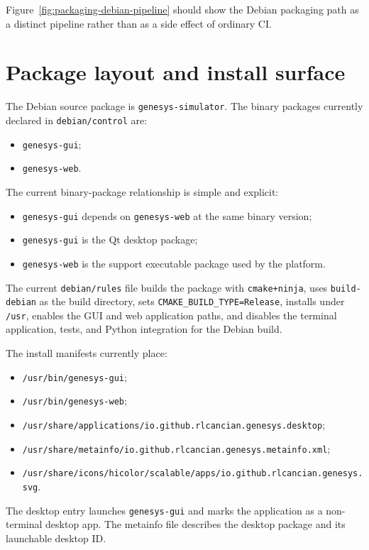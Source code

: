 Figure~\ref{fig:packaging-debian-pipeline} should show the Debian packaging path
as a distinct pipeline rather than as a side effect of ordinary CI.

\section{Package layout and install surface}
\label{sec:packaging-package-layout}

The Debian source package is \texttt{genesys-simulator}. The binary packages
currently declared in \texttt{debian/control} are:
\begin{itemize}
\item \texttt{genesys-gui};
\item \texttt{genesys-web}.
\end{itemize}

The current binary-package relationship is simple and explicit:
\begin{itemize}
\item \texttt{genesys-gui} depends on \texttt{genesys-web} at the same binary
  version;
\item \texttt{genesys-gui} is the Qt desktop package;
\item \texttt{genesys-web} is the support executable package used by the
  platform.
\end{itemize}

The current \texttt{debian/rules} file builds the package with
\texttt{cmake+ninja}, uses \texttt{build-debian} as the build directory, sets
\texttt{CMAKE\_BUILD\_TYPE=Release}, installs under \texttt{/usr}, enables the
GUI and web application paths, and disables the terminal application, tests, and
Python integration for the Debian build.

The install manifests currently place:
\begin{itemize}
\item \texttt{/usr/bin/genesys-gui};
\item \texttt{/usr/bin/genesys-web};
\item \texttt{/usr/share/applications/io.github.rlcancian.genesys.desktop};
\item \texttt{/usr/share/metainfo/io.github.rlcancian.genesys.metainfo.xml};
\item \texttt{/usr/share/icons/hicolor/scalable/apps/io.github.rlcancian.genesys.svg}.
\end{itemize}

The desktop entry launches \texttt{genesys-gui} and marks the application as a
non-terminal desktop app. The metainfo file describes the desktop package and
its launchable desktop ID.

